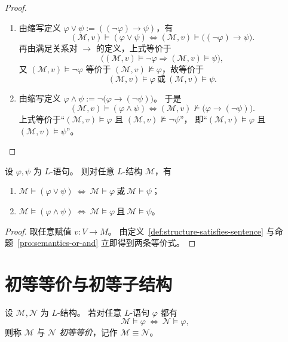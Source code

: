 \documentclass[lang=cn,a4paper,newtx,section]{elegantbook}
\begin{document}
 \begin{proof}
 \begin{enumerate}
   \item 由缩写定义 $\varphi\vee\psi:=((\neg\varphi)\to\psi)$，有
   \[
     (\mathcal M,v)\models(\varphi\vee\psi)
     \Longleftrightarrow
     (\mathcal M,v)\models\bigl((\neg\varphi)\to\psi\bigr).
   \]
   再由满足关系对 $\to$ 的定义，上式等价于
   \[
     \bigl((\mathcal M,v)\models\neg\varphi\Rightarrow(\mathcal M,v)\models\psi\bigr),
   \]
   又 $(\mathcal M,v)\models\neg\varphi$ 等价于 $(\mathcal M,v)\not\models\varphi$，故等价于
   \[
     (\mathcal M,v)\models\varphi\ \text{或}\ (\mathcal M,v)\models\psi.
   \]
   \item 由缩写定义 $\varphi\wedge\psi:=\neg\bigl(\varphi\to(\neg\psi)\bigr)$。
   于是
   \[
     (\mathcal M,v)\models(\varphi\wedge\psi)
     \Longleftrightarrow
     (\mathcal M,v)\not\models\bigl(\varphi\to(\neg\psi)\bigr).
   \]
   上式等价于“$(\mathcal M,v)\models\varphi$ 且 $(\mathcal M,v)\not\models\neg\psi$”，
   即“$(\mathcal M,v)\models\varphi$ 且 $(\mathcal M,v)\models\psi$”。
 \end{enumerate}
 \end{proof}

 \begin{proposition}[语句的析取与合取]
 \label{sentence-or-and}
 设 $\varphi,\psi$ 为 $L$-语句。
 则对任意 $L$-结构 $\mathcal M$，有
 \begin{enumerate}
   \item $\mathcal M\models(\varphi\vee\psi)\ \Longleftrightarrow\ \mathcal M\models\varphi\ \text{或}\ \mathcal M\models\psi$；
   \item $\mathcal M\models(\varphi\wedge\psi)\ \Longleftrightarrow\ \mathcal M\models\varphi\ \text{且}\ \mathcal M\models\psi$。
 \end{enumerate}
 \end{proposition}

 \begin{proof}
 取任意赋值 $v:V\to M$。
 由定义~\ref{def:structure-satisfies-sentence} 与命题~\ref{pro:semantics-or-and} 立即得到两条等价式。
 \end{proof}

\section{初等等价与初等子结构}

 \begin{definition}[初等等价]
 \label{elementary-equivalence}
 设 $\mathcal M,\mathcal N$ 为 $L$-结构。
 若对任意 $L$-语句 $\varphi$ 都有
 \[
   \mathcal M\models\varphi\ \Longleftrightarrow\ \mathcal N\models\varphi,
 \]
 则称 $\mathcal M$ 与 $\mathcal N$ \emph{初等等价}，记作 $\mathcal M\equiv\mathcal N$。
 \end{definition}
\end{document}
